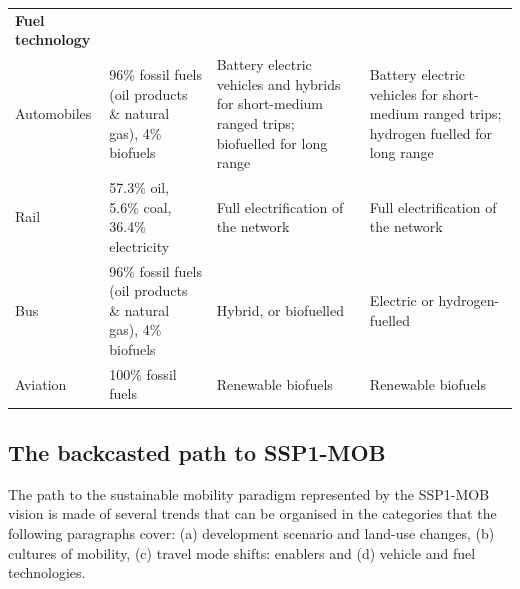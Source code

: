 \begin{longtable}{p{2.5cm}p{4.5cm}p{4cm}p{4cm}}
\textbf{Fuel technology} &  &  &  \\*
Automobiles & 96\% fossil fuels (oil products \& natural gas), 4\% biofuels \parencite{iea2017_Statisticswebportal} & Battery electric vehicles and hybrids for short-medium ranged trips; biofuelled for long range & Battery electric vehicles for short-medium ranged trips; hydrogen fuelled for long range \\*
Rail & 57.3\% oil, 5.6\% coal, 36.4\% electricity \parencite{cazzola2016_RailwayHandbook2016} & Full electrification of the network & Full electrification of the network \\*
Bus & 96\% fossil fuels (oil products \& natural gas), 4\% biofuels \parencite{iea2017_Statisticswebportal} & Hybrid, or biofuelled & Electric or hydrogen-fuelled \\*
Aviation & 100\% fossil fuels \parencite{iea2017_Statisticswebportal} & Renewable biofuels & Renewable biofuels
\end{longtable}
\endgroup

\subsection{The backcasted path to SSP1-MOB}
\label{ss:results:backcasting-the-path}
The path to the sustainable mobility paradigm represented by the SSP1-MOB vision is made of several trends that can be organised in the categories that the following paragraphs cover: (a) development scenario and land-use changes, (b) cultures of mobility, (c) travel mode shifts: enablers and (d) vehicle and fuel technologies.

